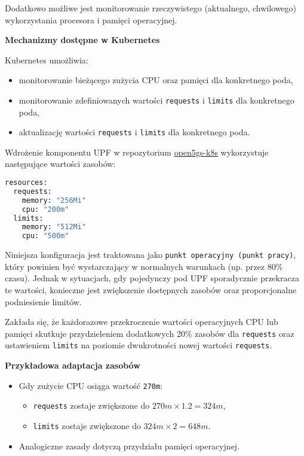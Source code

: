 Dodatkowo możliwe jest monitorowanie rzeczywistego (aktualnego, chwilowego) wykorzystania procesora i pamięci operacyjnej.


\textbf{Mechanizmy dostępne w Kubernetes}

Kubernetes umożliwia:
\begin{itemize}
    \item monitorowanie bieżącego zużycia CPU oraz pamięci dla konkretnego poda,
    \item monitorowanie zdefiniowanych wartości \texttt{requests} i \texttt{limits} dla konkretnego poda,
    \item aktualizację wartości \texttt{requests} i \texttt{limits} dla konkretnego poda.
\end{itemize}

Wdrożenie komponentu UPF w repozytorium \href{https://github.com/niloysh/open5gs-k8s}{open5gs-k8s} wykorzystuje następujące wartości zasobów:

\begin{lstlisting}[language=sh, caption=Konfiguracja zasobów dla UPF w Open5GS]
resources:
  requests:
    memory: "256Mi"
    cpu: "200m"
  limits:
    memory: "512Mi"
    cpu: "500m"
\end{lstlisting}

Niniejsza konfiguracja jest traktowana jako \texttt{punkt operacyjny (punkt pracy)}, który powinien być wystarczający w normalnych warunkach (np. przez 80\% czasu). Jednak w sytuacjach, gdy pojedynczy pod UPF sporadycznie przekracza te wartości, konieczne jest zwiększenie dostępnych zasobów oraz proporcjonalne podniesienie limitów.

Zakłada się, że każdorazowe przekroczenie wartości operacyjnych CPU lub pamięci skutkuje przydzieleniem dodatkowych 20\% zasobów dla \texttt{requests} oraz ustawieniem \texttt{limits} na poziomie dwukrotności nowej wartości \texttt{requests}.

\textbf{Przykładowa adaptacja zasobów}

\begin{itemize}
    \item Gdy zużycie CPU osiąga wartość \texttt{270m}:
    \begin{itemize}
        \item \texttt{requests} zostaje zwiększone do \( 270m \times 1.2 = 324m \),
        \item \texttt{limits} zostaje zwiększone do \( 324m \times 2 = 648m \).
    \end{itemize}
    \item Analogiczne zasady dotyczą przydziału pamięci operacyjnej.
\end{itemize}

